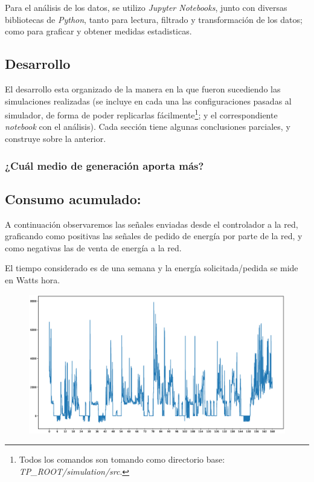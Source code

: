 Para el análisis de los datos, se utilizo \textit{Jupyter Notebooks}, junto
con diversas bibliotecas de \textit{Python}, tanto para lectura, filtrado y
transformación de los datos; como para graficar y obtener medidas
estadisticas.

\subsection{Desarrollo}
El desarrollo esta organizado de la manera en la que fueron sucediendo las
simulaciones realizadas (se incluye en cada una las configuraciones pasadas
al simulador, de forma de poder replicarlas fácilmente\footnote{Todos los
comandos son tomando como directorio base:
\textit{TP\_ROOT/simulation/src}.}; y el correspondiente \textit{notebook}
con el análisis). Cada sección tiene algunas conclusiones parciales, y
construye sobre la anterior.

\subsubsection{¿Cuál medio de generación aporta más?}



\subsection{Consumo acumulado:}
A continuación observaremos las señales enviadas desde el controlador a la red, graficando
como positivas las señales de pedido de energía por parte de la red, y como negativas las
de venta de energía a la red.

El tiempo considerado es de una semana y la energía solicitada/pedida se mide en Watts hora.

\begin{figure}[H]
    \centering
    \includegraphics[scale=0.3]{images/cons.eps}
\end{figure}

